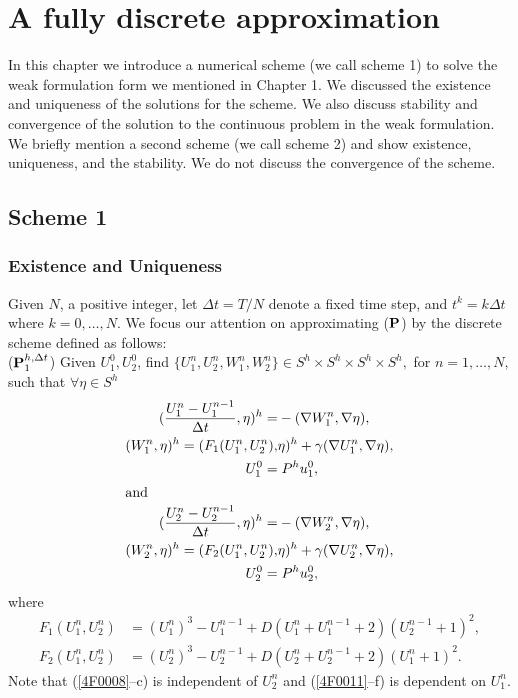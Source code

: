 \chapter{A fully discrete  approximation}
In this chapter we introduce a numerical scheme (we call scheme 1) to solve the
weak formulation form  we mentioned in Chapter 1.  We discussed the
existence and uniqueness of the solutions for the scheme. We also
discuss stability and convergence of the solution
to the continuous problem in the weak formulation.  We briefly mention
a second scheme (we call scheme 2) and show
existence, uniqueness, and the stability.
We do not discuss the convergence of the scheme.

\setcounter{equation}{0}
\section{Scheme 1}
\subsection{Existence and Uniqueness}
Given $N$, a positive integer, let $\Delta t= T/N$ denote a fixed time step,
and $t^k=k\Delta t$ where $k=0,\dots ,N.$  We focus
our attention on approximating ($\mbox{\boldmath$\rm P$}$) by the discrete scheme
defined as follows:\\
($\mbox{\boldmath$\rm P$}^{h,\Delta t}_1$) \quad Given $U_1^0, U_2^0$, find
$\{U_1^n, U_2^n, W_1^n, W_2^n\} \in S^h\times S^h\times S^h\times S^h,$ for  $n=1,\dots, N,$ such that
$\forall \eta \in S^h $
\eqlabon 
\begin{align} 
(\frac{U^n_{1}-U_1^{n-1}}{\Delta t} ,\eta)^h  = &- (\nabla W^n_{1} ,\nabla \eta  ),\label{4F0008}\\
(W^n_{1},\eta)^h  =(F_1(U_1^n,U_2^n), & \eta)^h+\gamma
(\nabla U^n_{1} ,\nabla \eta),\label{4F0009}\\
U^0_1=&\; P^h u_{1}^{0},\label{4F0010}\\
\intertext{and}
(\frac{U^n_{2}-U_2^{n-1}}{\Delta t},\eta)^h  = &- (\nabla W^n_{2} ,\nabla \eta ),\label{4F0011}\\
(W^n_{2},\eta)^h  =(F_2(U_1^n,U_2^n), & \eta)^h+\gamma(\nabla U^n_{2} ,\nabla \eta ),\label{4F0012}\\
U^0_2 = & \; P^h u_{2}^{0},\label{4F0013}
\end{align}
where
\begin{align}
F_1(U_1^n,U_2^n) & = ({U^n_1})^3- U^{n-1}_1  +
D(U^{n}_1+U^{n-1}_1+2)(U^{n-1}_2+1)^2,\label{4F0014}\\
F_2(U_1^n,U_2^n) & = ({U^n_2})^3- U^{n-1}_2 + 
D(U^{n}_2+U^{n-1}_2+2)(U^{n}_1+1)^2.\label{4F0015}
\end{align}
Note that (\ref{4F0008}--c) is independent of $U^n_2$ and
(\ref{4F0011}--f) is dependent on $U^n_1.$


